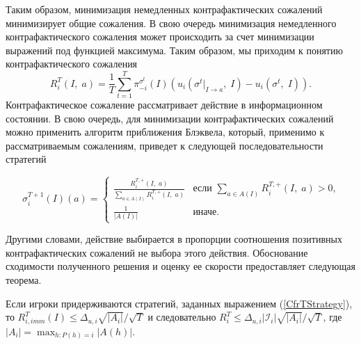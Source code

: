 Таким образом, минимизация немедленных контрафактических сожалений минимизирует общие сожаления. В свою очередь минимизация немедленного контрафактического сожаления может происходить за счет минимизации выражений под функцией максимума. Таким образом, мы приходим к понятию контрафактического сожаления 
\begin{equation}
	R_i^T(I,\; a) = \frac{1}{T}\sum_{t=1}^{T}\pi_{-i}^{\sigma^t}(I)(u_i(\sigma^t |_{I \to a},\;I)-u_i(\sigma^t,\;I)).
\end{equation}
Контрафактическое сожаление рассматривает действие в информационном состоянии. В свою очередь, для минимизации контрафактических сожалений можно применить алгоритм приближения Блэквела, который, применимо к рассматриваемым сожалениям, приведет к следующей последовательности стратегий 

\begin{equation}\label{CfrTStrategy}
	\sigma_i^{T+1}(I)(a)= 
	\begin{cases}
		\frac{R_i^{T,+}(I,\;a)}{\sum_{a\in A(I)}R_i^{T,+}(I,\;a)} &\text{если $\sum_{a\in A(I)}R_i^{T,+}(I,\;a) > 0$,}\\
		\frac{1}{|A(I)|} &\text{иначе.}
	\end{cases}
\end{equation}

Другими словами, действие выбирается в пропорции соотношения позитивных контрафактических сожалений не выбора этого действия. Обоснование сходимости полученного решения и оценку ее скорости предоставляет следующая теорема. 

\begin{theo}\label{CfrTStrategyExp}
	Если игроки придерживаются стратегий, заданных выражением (\ref{CfrTStrategy}), то $R_{i,imm}^T(I) \leq \Delta_{u,i}\sqrt{|A_i|}/\sqrt{T}$ и следовательно $R_i^T \leq \Delta_{u,i}|\mathcal{I}_i|\sqrt{|A_i|}/\sqrt{T}$, где $|A_i|=\max_{h\colon P(h)=i}|A(h)|$.
\end{theo}